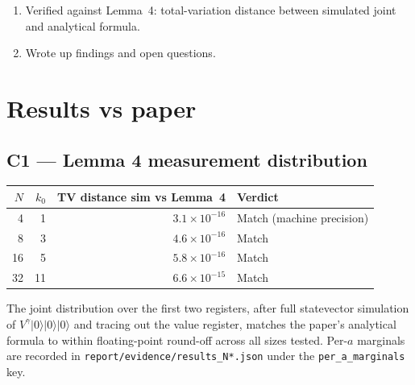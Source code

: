 \documentclass[11pt]{article}
\begin{document}
\begin{enumerate}
\begin{lstlisting}
python report/evidence/ettinger_hoyer_dihedral.py --N 4  --k0 1  --trials 800 --out report/evidence/results_N4_k1.json
python report/evidence/ettinger_hoyer_dihedral.py --N 8  --k0 3  --trials 800 --out report/evidence/results_N8_k3.json
python report/evidence/ettinger_hoyer_dihedral.py --N 16 --k0 5  --trials 500 --out report/evidence/results_N16_k5.json
python report/evidence/ettinger_hoyer_dihedral.py --N 32 --k0 11 --trials 300 --out report/evidence/results_N32_k11.json
\end{lstlisting}
  \item Verified against Lemma~4: total-variation distance between simulated
        joint and analytical formula.
  \item Wrote up findings and open questions.
\end{enumerate}

\section{Results vs paper}
\subsection{C1 --- Lemma 4 measurement distribution}
\begin{center}
\begin{tabular}{@{}rrrl@{}}
\toprule
$N$ & $k_0$ & TV distance sim vs Lemma~4 & Verdict \\
\midrule
4  & 1  & $3.1\times10^{-16}$ & Match (machine precision) \\
8  & 3  & $4.6\times10^{-16}$ & Match \\
16 & 5  & $5.8\times10^{-16}$ & Match \\
32 & 11 & $6.6\times10^{-15}$ & Match \\
\bottomrule
\end{tabular}
\end{center}
The joint distribution over the first two registers, after full statevector
simulation of $V^\gamma|0\rangle|0\rangle|0\rangle$ and tracing out the value
register, matches the paper's analytical formula to within floating-point
round-off across all sizes tested. Per-$a$ marginals are recorded in
\texttt{report/evidence/results\_N*.json} under the \texttt{per\_a\_marginals}
key.
\end{document}

